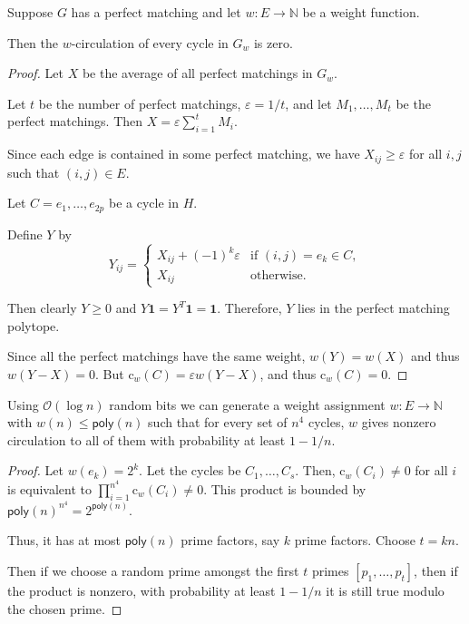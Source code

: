 \documentclass{beamer}
\theoremstyle{remark}
\newcommand{\nn}{\mathbb{N}}
\newcommand{\cl}{\text{c}}
\newcommand{\OO}{\mathcal{O}}
\begin{document}
\begin{frame}[allowframebreaks]
  \begin{lemma}
    Suppose $G$ has a perfect matching and let
    $w : E \to \nn$ be a weight function.

    Then the $w$-circulation of every cycle in $G_w$ is zero.
  \end{lemma}

  \begin{proof}
    Let $X$ be the average of all perfect matchings in $G_w$.

    Let $t$ be the number of perfect matchings, $\varepsilon = 1/t$, and let
    $M_1, \ldots, M_t$ be the perfect matchings.
    Then $X = \varepsilon \sum_{i = 1}^t M_i$.

    Since each edge is contained in some perfect matching, we have
    $X_{ij} \ge \varepsilon$ for all $i, j$ such that
    $(i, j) \in E$.

    Let $C = {e_1, \ldots, e_{2p}}$ be a cycle in $H$.

    Define $Y$ by
    \[
      Y_{ij} =
      \begin{cases}
        X_{ij} + (-1)^{k} \varepsilon & \text{if } (i, j) = e_k \in C, \\
        X_{ij}                        & \text{otherwise}.
      \end{cases}
    \]

    Then clearly $Y \ge 0$ and $Y \mathbf{1} = Y^T \mathbf{1} = \mathbf{1}$.
    Therefore, $Y$ lies in the perfect matching polytope.

    Since all the perfect matchings have the same weight, $w(Y) = w(X)$
    and thus $w(Y - X) = 0$.
    But $\cl_w(C) = \varepsilon w(Y - X)$, and thus $\cl_w(C) = 0$.
  \end{proof}
\end{frame}
\begin{frame}
  \begin{lemma}
    Using $\OO(\log n)$ random bits we can
    generate a weight assignment
    $w : E \to \nn$ with $w(n) \le \mathsf{poly}(n)$ such that for every set
    of $n^4$ cycles,
    $w$ gives nonzero circulation to all of them with probability at
    least $1 - 1/n$.
  \end{lemma}

  \begin{proof}
    Let $w(e_k) = 2^k$.
    Let the cycles be $C_1, \ldots, C_s$. Then, $\cl_w(C_i) \ne 0$ for
    all $i$ is equivalent to
    $\prod_{i = 1}^{n^4} \cl_w(C_i) \ne 0$. This product is bounded by
    $\mathsf{poly}(n)^{n^4} = 2^{\mathsf{poly}(n)}$.

    Thus, it has at most $\mathsf{poly}(n)$ prime factors, say $k$ prime
    factors. Choose $t = kn$.

    Then if we choose a random prime amongst the first $t$ primes
    $[p_1, \ldots, p_t]$, then if the product is nonzero,
    with probability at least $1 - 1/n$ it is still true modulo the chosen prime.
  \end{proof}
\end{frame}
\end{document}
